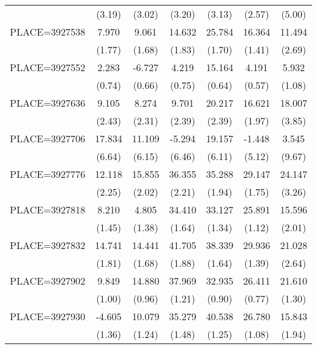 {\begin{tabular}{l*{6}{c}}
                    &      (3.19)&      (3.02)&      (3.20)&      (3.13)&      (2.57)&      (5.00)\\
PLACE=3927538       &       7.970&       9.061&      14.632&      25.784&      16.364&      11.494\\
                    &      (1.77)&      (1.68)&      (1.83)&      (1.70)&      (1.41)&      (2.69)\\
PLACE=3927552       &       2.283&      -6.727&       4.219&      15.164&       4.191&       5.932\\
                    &      (0.74)&      (0.66)&      (0.75)&      (0.64)&      (0.57)&      (1.08)\\
PLACE=3927636       &       9.105&       8.274&       9.701&      20.217&      16.621&      18.007\\
                    &      (2.43)&      (2.31)&      (2.39)&      (2.39)&      (1.97)&      (3.85)\\
PLACE=3927706       &      17.834&      11.109&      -5.294&      19.157&      -1.448&       3.545\\
                    &      (6.64)&      (6.15)&      (6.46)&      (6.11)&      (5.12)&      (9.67)\\
PLACE=3927776       &      12.118&      15.855&      36.355&      35.288&      29.147&      24.147\\
                    &      (2.25)&      (2.02)&      (2.21)&      (1.94)&      (1.75)&      (3.26)\\
PLACE=3927818       &       8.210&       4.805&      34.410&      33.127&      25.891&      15.596\\
                    &      (1.45)&      (1.38)&      (1.64)&      (1.34)&      (1.12)&      (2.01)\\
PLACE=3927832       &      14.741&      14.441&      41.705&      38.339&      29.936&      21.028\\
                    &      (1.81)&      (1.68)&      (1.88)&      (1.64)&      (1.39)&      (2.64)\\
PLACE=3927902       &       9.849&      14.880&      37.969&      32.935&      26.411&      21.610\\
                    &      (1.00)&      (0.96)&      (1.21)&      (0.90)&      (0.77)&      (1.30)\\
PLACE=3927930       &      -4.605&      10.079&      35.279&      40.538&      26.780&      15.843\\
                    &      (1.36)&      (1.24)&      (1.48)&      (1.25)&      (1.08)&      (1.94)\\

\end{tabular}}
